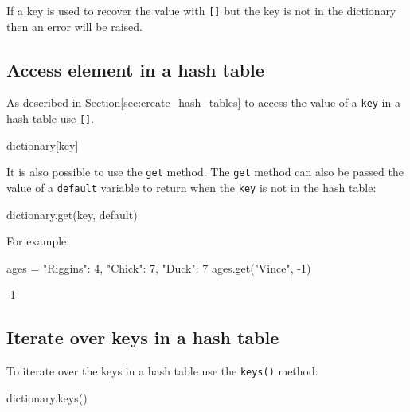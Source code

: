 \begin{note}
If a key is used to recover the value with \texttt{{[}{]}} but the key is not in the dictionary then
an error will be raised.
\end{note}



\subsection{Access element in a hash table}
\label{\detokenize{building-tools/02-functions-and-data-structures/how/main:access-element-in-a-hash-table}}

As described in Section\ref{sec:create_hash_tables} to access the value of a \texttt{key} in a hash
table use \texttt{{[}{]}}.


\begin{pyin}
dictionary[key]
\end{pyin}



It is also possible to use the \texttt{get} method.
The \texttt{get} method can also be passed the value of a \texttt{default} variable to return when the
\texttt{key} is not in the hash table:


\begin{pyin}
dictionary.get(key, default)
\end{pyin}



For example:




\begin{pyin}
ages = {"Riggins": 4, "Chick": 7, "Duck": 7}
ages.get("Vince", -1)
\end{pyin}





\begin{raw}
-1
\end{raw}





\subsection{Iterate over keys in a hash table}
\label{\detokenize{building-tools/02-functions-and-data-structures/how/main:iterate-over-keys-in-a-hash-table}}

To iterate over the keys in a hash table use the \texttt{keys()} method:


\begin{pyin}
dictionary.keys()
\end{pyin}



